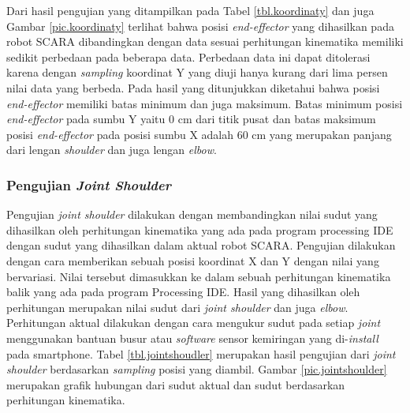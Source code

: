 Dari hasil pengujian yang ditampilkan pada Tabel \ref{tbl.koordinaty} dan juga Gambar \ref{pic.koordinaty} terlihat bahwa posisi \textit{end-effector} yang dihasilkan pada robot SCARA dibandingkan dengan data sesuai perhitungan kinematika memiliki sedikit perbedaan pada beberapa data. Perbedaan data ini dapat ditolerasi karena dengan \textit{sampling} koordinat Y yang diuji hanya kurang dari lima persen nilai data yang berbeda. Pada hasil yang ditunjukkan diketahui bahwa posisi \textit{end-effector} memiliki batas minimum dan juga maksimum. Batas minimum posisi \textit{end-effector} pada sumbu Y yaitu 0 cm dari titik pusat dan batas maksimum posisi \textit{end-effector} pada posisi sumbu X adalah 60 cm yang merupakan panjang dari lengan \textit{shoulder} dan juga lengan \textit{elbow}. 

\subsubsection{Pengujian \textit{Joint Shoulder}}
Pengujian \textit{joint shoulder} dilakukan dengan membandingkan nilai sudut yang dihasilkan oleh perhitungan kinematika yang ada pada program processing IDE dengan sudut yang dihasilkan dalam aktual robot SCARA. Pengujian dilakukan dengan cara memberikan sebuah posisi koordinat X dan Y dengan nilai yang bervariasi. Nilai tersebut dimasukkan ke dalam sebuah perhitungan kinematika balik yang ada pada program Processing IDE. Hasil yang dihasilkan oleh perhitungan merupakan nilai sudut dari \textit{joint shoulder} dan juga \textit{elbow}. Perhitungan aktual dilakukan dengan cara mengukur sudut pada setiap \textit{joint} menggunakan bantuan busur atau \textit{software} sensor kemiringan yang di-\textit{install} pada smartphone. Tabel \ref{tbl.jointshoudler} merupakan hasil pengujian dari \textit{joint shoulder} berdasarkan \textit{sampling} posisi yang diambil. Gambar \ref{pic.jointshoulder} merupakan grafik hubungan dari sudut aktual dan sudut berdasarkan perhitungan kinematika. 

